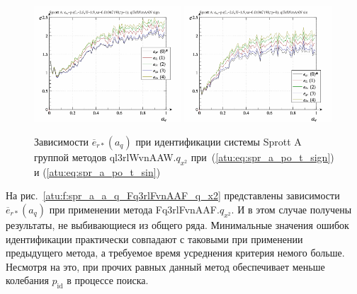 \begin{figure}[htb!]
  \centerline{
    \includegraphics[width=0.49\textwidth]{p/cha/spr_a/ql3rlWvnAAW_x2/sprott_a_id-p_a_q_sign.png}
    \hfill
    \includegraphics[width=0.49\textwidth]{p/cha/spr_a/ql3rlWvnAAW_x2/sprott_a_id-p_a_q_sin.png}
  }
  \caption{Зависимости $\overline{e}_{r*}(a_q)$ при идентификации системы Sprott A группой методов ql3rlWvnAAW.$q_{x^2}$
   при~(\ref{atu:eq:spr_a_po_t_sign}) и (\ref{atu:eq:spr_a_po_t_sin})}
  \label{atu:f:spr_a_a_q_ql3rlWvnAAW_q_x2}
\end{figure}


На рис.~\ref{atu:f:spr_a_a_q_Fq3rlFvnAAF_q_x2} представлены зависимости
$\overline{e}_{r*}(a_q)$ при применении метода Fq3rlFvnAAF.$q_{x^2}$.
И в этом случае получены результаты, не выбивающиеся из общего ряда.
Минимальные значения ошибок идентификации практически совпадают
с таковыми при применении предыдущего метода, а требуемое
время усреднения критерия немого больше. Несмотря на это,
при прочих равных данный метод обеспечивает меньше колебания $p_\mathrm{id}$
в процессе поиска.


